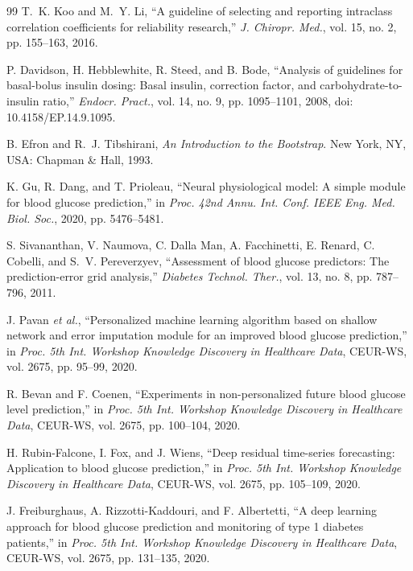 \documentclass[journal]{IEEEtran}
\begin{document}
\begin{thebibliography}{99}
\label{ref76label} T.~K. Koo and M.~Y. Li, ``A guideline of selecting and reporting intraclass correlation coefficients for reliability research,'' \emph{J. Chiropr. Med.}, vol. 15, no. 2, pp. 155--163, 2016.

\label{ref77label} P. Davidson, H. Hebblewhite, R. Steed, and B. Bode, ``Analysis of guidelines for basal-bolus insulin dosing: Basal insulin, correction factor, and carbohydrate-to-insulin ratio,'' \emph{Endocr. Pract.}, vol. 14, no. 9, pp. 1095--1101, 2008, doi: 10.4158/EP.14.9.1095.

\label{ref78label} B. Efron and R.~J. Tibshirani, \emph{An Introduction to the Bootstrap}. New York, NY, USA: Chapman \& Hall, 1993.

\label{ref59label} K. Gu, R. Dang, and T. Prioleau, ``Neural physiological model: A simple module for blood glucose prediction,'' in \emph{Proc. 42nd Annu. Int. Conf. IEEE Eng. Med. Biol. Soc.}, 2020, pp. 5476--5481.

\label{ref53label} S. Sivananthan, V. Naumova, C. Dalla Man, A. Facchinetti, E. Renard, C. Cobelli, and S.~V. Pereverzyev, ``Assessment of blood glucose predictors: The prediction-error grid analysis,'' \emph{Diabetes Technol. Ther.}, vol. 13, no. 8, pp. 787--796, 2011.

\label{ref60label} J. Pavan \emph{et al.}, ``Personalized machine learning algorithm based on shallow network and error imputation module for an improved blood glucose prediction,'' in \emph{Proc. 5th Int. Workshop Knowledge Discovery in Healthcare Data}, CEUR-WS, vol. 2675, pp. 95--99, 2020.

\label{ref61label} R. Bevan and F. Coenen, ``Experiments in non-personalized future blood glucose level prediction,'' in \emph{Proc. 5th Int. Workshop Knowledge Discovery in Healthcare Data}, CEUR-WS, vol. 2675, pp. 100--104, 2020.

\label{ref62label} H. Rubin-Falcone, I. Fox, and J. Wiens, ``Deep residual time-series forecasting: Application to blood glucose prediction,'' in \emph{Proc. 5th Int. Workshop Knowledge Discovery in Healthcare Data}, CEUR-WS, vol. 2675, pp. 105--109, 2020.

\label{ref63label} J. Freiburghaus, A. Rizzotti-Kaddouri, and F. Albertetti, ``A deep learning approach for blood glucose prediction and monitoring of type 1 diabetes patients,'' in \emph{Proc. 5th Int. Workshop Knowledge Discovery in Healthcare Data}, CEUR-WS, vol. 2675, pp. 131--135, 2020.


\end{thebibliography}
\end{document}

